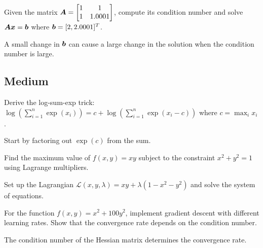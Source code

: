 \begin{exercisebox}[easy]
\begin{problem}
\label{prob:matrix-conditioning}
Given the matrix $\boldsymbol{A} = \begin{bmatrix} 1 & 1 \\ 1 & 1.0001 \end{bmatrix}$, compute its condition number and solve $\boldsymbol{A}\boldsymbol{x} = \boldsymbol{b}$ where $\boldsymbol{b} = [2, 2.0001]^T$.
\end{problem}
\begin{hintbox}
A small change in $\boldsymbol{b}$ can cause a large change in the solution when the condition number is large.
\end{hintbox}
\end{exercisebox}


\subsection*{Medium}

\begin{exercisebox}[medium]
\begin{problem}
\label{prob:log-sum-exp}
Derive the log-sum-exp trick: $\log\left(\sum_{i=1}^n \exp(x_i)\right) = c + \log\left(\sum_{i=1}^n \exp(x_i - c)\right)$ where $c = \max_i x_i$.
\end{problem}
\begin{hintbox}
Start by factoring out $\exp(c)$ from the sum.
\end{hintbox}
\end{exercisebox}


\begin{exercisebox}[medium]
\begin{problem}
\label{prob:lagrange-multipliers}
Find the maximum value of $f(x, y) = xy$ subject to the constraint $x^2 + y^2 = 1$ using Lagrange multipliers.
\end{problem}
\begin{hintbox}
Set up the Lagrangian $\mathcal{L}(x, y, \lambda) = xy + \lambda(1 - x^2 - y^2)$ and solve the system of equations.
\end{hintbox}
\end{exercisebox}


\begin{exercisebox}[medium]
\begin{problem}
\label{prob:gradient-convergence}
For the function $f(x, y) = x^2 + 100y^2$, implement gradient descent with different learning rates. Show that the convergence rate depends on the condition number.
\end{problem}
\begin{hintbox}
The condition number of the Hessian matrix determines the convergence rate.
\end{hintbox}
\end{exercisebox}


